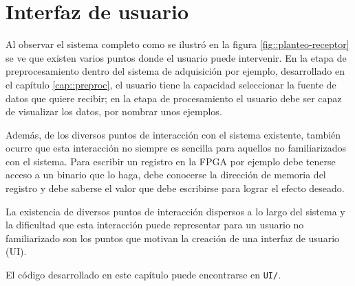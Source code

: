 \documentclass[../../main.tex]{subfiles}
\begin{document}
\graphicspath{{./figures}}
\chapter{Interfaz de usuario}
Al observar el sistema completo como se ilustró en la figura \ref{fig::planteo-receptor} se ve que existen  varios puntos donde el usuario puede intervenir. En la etapa de preprocesamiento dentro del sistema de adquisición por ejemplo, desarrollado en el capítulo \ref{cap::preproc}, el usuario tiene la capacidad seleccionar la fuente de datos que quiere recibir; en la etapa de procesamiento el usuario debe ser capaz de visualizar los datos, por nombrar unos ejemplos.

Además, de los diversos puntos de interacción con el sistema existente, también ocurre que esta interacción no siempre es sencilla para aquellos no familiarizados con el sistema. Para escribir un registro en la FPGA por ejemplo debe tenerse acceso a un binario que lo haga, debe conocerse la dirección de memoria del registro y debe saberse el valor que debe escribirse para lograr el efecto deseado.

La existencia de diversos puntos de interacción dispersos a lo largo del sistema y la dificultad que esta interacción puede representar para un usuario no familiarizado son los puntos que motivan la creación de una interfaz de usuario (UI).

El código desarrollado en este capítulo puede encontrarse en \texttt{UI/}.
\end{document}
